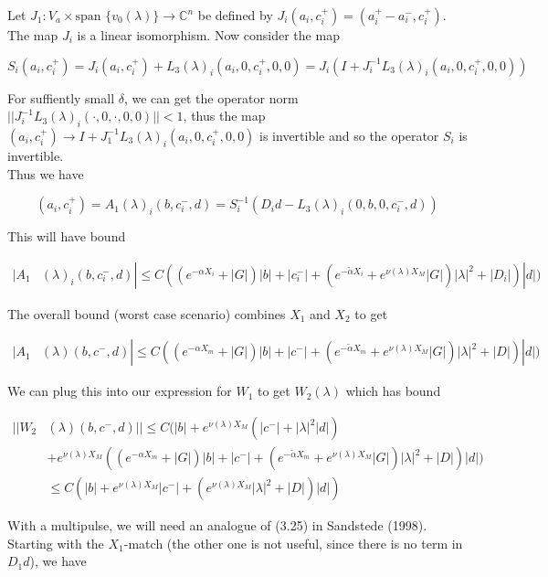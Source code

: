 \documentclass[12pt]{article}
\def\C{{\mathbb C}}
\begin{document}
\begin{enumerate}
Let $J_1: V_a \times \text{span }\{v_0(\lambda)\} \rightarrow \C^n$ be defined by $J_i(a_i, c_i^+) = (a_i^+ - a_i^-, c_i^+)$. The map $J_i$ is a linear isomorphism. Now consider the map

\[
S_i(a_i, c_i^+) = J_i (a_i, c_i^+) + L_3(\lambda)_i(a_i, 0, c_i^+, 0, 0) = J_i( I + J_i^{-1} L_3(\lambda)_i(a_i, 0, c_i^+, 0, 0))
\]


For suffiently small $\delta$, we can get the operator norm $||J_i^{-1} L_3(\lambda)_i(\cdot, 0, \cdot, 0, 0)|| < 1$, thus the map $(a_i, c_i^+) \rightarrow I + J_1^{-1} L_3(\lambda)_i(a_i, 0, c_i^+, 0, 0)$ is invertible and so the operator $S_i$ is invertible.\\

Thus we have

\[
(a_i, c_i^+) = A_1(\lambda)_i(b, c_i^-, d) = S_i^{-1}(D_i d - L_3(\lambda)_i(0, b, 0, c_i^-, d))
\]

This will have bound

\begin{align*}
|A_1&(\lambda)_i(b, c_i^-, d)| \leq C( (e^{-\alpha X_i} + |G|) |b| + |c_i^-| + (e^{-\tilde{\alpha} X_i} + e^{\nu(\lambda)X_M} |G|) |\lambda|^2 + |D_i|) |d| )
\end{align*}

The overall bound (worst case scenario) combines $X_1$ and $X_2$ to get

\begin{align*}
|A_1&(\lambda)(b, c^-, d)| \leq C( (e^{-\alpha X_m} + |G|) |b| + |c^-| + (e^{-\tilde{\alpha} X_m} + e^{\nu(\lambda)X_M} |G|) |\lambda|^2 + |D|) |d| )
\end{align*}

We can plug this into our expression for $W_1$ to get $W_2(\lambda)$ which has bound

\begin{align*}
||W_2&(\lambda)(b,c^-, d)|| \leq C(|b| + e^{\nu(\lambda)X_M}(|c^-| + |\lambda|^2 |d|) \\
&+ e^{\nu(\lambda)X_M}((e^{-\alpha X_m} + |G|) |b| + |c^-| + (e^{-\tilde{\alpha} X_m} + e^{\nu(\lambda)X_M} |G|) |\lambda|^2 + |D|) |d| )\\
&\leq C(|b| + e^{\nu(\lambda)X_M}|c^-| + (e^{\nu(\lambda)X_M} |\lambda|^2 + |D|)|d| )
\end{align*}

With a multipulse, we will need an analogue of (3.25) in Sandstede (1998). Starting with the $X_1$-match (the other one is not useful, since there is no term in $D_1 d$), we have


\end{enumerate}
\end{document}
